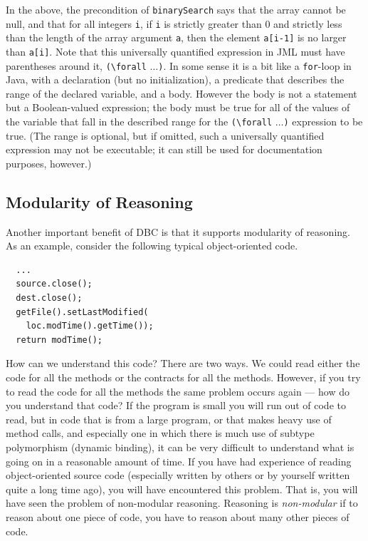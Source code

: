 \documentclass[twocolumn]{article}
\begin{document}
In the above, the precondition of \texttt{binarySearch} says that the
array cannot be null, and that for all integers \texttt{i},
if \texttt{i} is strictly greater than 0 and strictly less than the
length of the array argument \texttt{a}, then the element
\texttt{a[i-1]} is no larger than \texttt{a[i]}.
Note that this universally quantified expression in JML must have
parentheses around it, \verb|(\forall| $\dots$\verb|)|.
In some sense it is a bit like a \texttt{for}-loop in Java, with a
declaration (but no initialization), a predicate that describes the
range of the declared variable, and a body.  However the body is not a
statement but a Boolean-valued expression; the body must be true for
all of the values of the variable that fall in the described range for the
\verb|(\forall| $\dots$\verb|)| expression to be true.  (The range is
optional, but if omitted, such a universally quantified expression may
not be executable; it can still be used for documentation purposes, however.)

\subsection{Modularity of Reasoning}

Another important benefit of DBC is that it supports modularity of
reasoning.
As an example, consider the following typical object-oriented code.

\begin{verbatim}
  ...
  source.close();
  dest.close();
  getFile().setLastModified(
    loc.modTime().getTime());
  return modTime();
\end{verbatim}

How can we understand this code?  There are
two ways. We could read either the code for all the methods or the
contracts for all the methods.
However, if you try to read the code for all the methods the same
problem occurs again --- how do you understand that code?
If the program is small you will run out of code to read, but in code
that is from a large program, or that makes heavy use of method calls, and
especially one in which there is much use of subtype polymorphism
(dynamic binding), it can be very difficult to understand what is
going on in a reasonable amount of time.
If you have had experience of reading object-oriented source code
(especially written by others or by yourself written quite a long time
ago), you will have encountered this problem.  That is, you will have
seen the problem of non-modular reasoning.  Reasoning is
\emph{non-modular\/} if to reason about one piece of code, you have to
reason about many other pieces of code.
\end{document}
